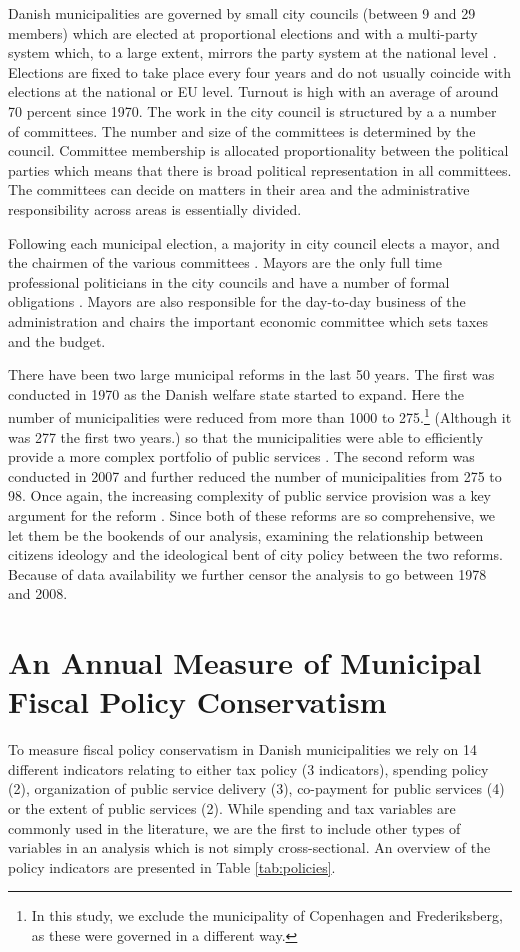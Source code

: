 \documentclass[a4paper,12pt]{article}
\begin{document}
Danish municipalities are governed by small city councils (between 9 and 29 members) which are elected at proportional elections and with a multi-party system which, to a large extent, mirrors the party system at the national level \citep{blom2013et}. Elections are fixed to take place every four years and do not usually coincide with elections at the national or EU level. Turnout is high with an average of around 70 percent since 1970.  The work in the city council is structured by a a number of committees. The number and size of the committees is determined by the council. Committee membership is allocated proportionality between the political parties which means that there is broad political representation in all committees. The committees can decide on matters in their area and the administrative responsibility across areas is essentially divided. 

Following each municipal election, a majority in city council elects a mayor, and the chairmen of the various committees \citep{serritzlew2008explaining}. Mayors are the only full time professional politicians in the city councils and have a number of formal obligations \citep{kjaer2015urban}. Mayors are also responsible for the day-to-day business of the administration and chairs the important economic committee which sets taxes and the budget.


There have been two large municipal reforms in the last 50 years. The first was conducted in 1970 as the Danish welfare state started to expand. Here the number of municipalities were reduced from more than 1000 to 275.\footnote{In this study, we exclude the municipality of Copenhagen and Frederiksberg, as these were governed in a different way.} (Although it was 277 the first two years.) so that the municipalities were able to efficiently provide a more complex portfolio of public services \citep{ingvartsen1991kommunalreformen}. The second reform was conducted in 2007 and further reduced the number of municipalities from 275 to 98. Once again, the increasing complexity of public service provision was a key argument for the reform \citep{christiansen2008utaenkelige}. Since both of these reforms are so comprehensive, we let them be the bookends of our analysis, examining the relationship between citizens ideology and the ideological bent of city policy between the two reforms. Because of data availability we further censor the analysis to go between 1978 and 2008.

\section{An Annual Measure of Municipal Fiscal Policy Conservatism}
To measure fiscal policy conservatism in Danish municipalities we rely on 14 different indicators relating to either tax policy (3 indicators), spending policy (2), organization of public service delivery (3), co-payment for public services (4) or the extent of public services (2). While  spending and tax variables are commonly used in the literature, we are the first to include other types of variables in an analysis which is not simply cross-sectional. An overview of the policy indicators are presented in Table \ref{tab:policies}.
\end{document}
